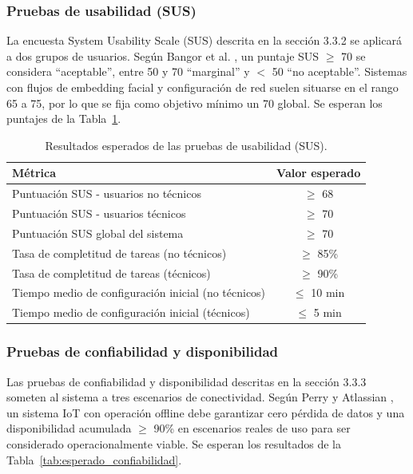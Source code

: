 \documentclass{iccmemoria}
\begin{document}
\subsubsection{Pruebas de usabilidad (SUS)}
La encuesta System Usability Scale (SUS) descrita en la sección 3.3.2 se aplicará a dos grupos de usuarios. Según Bangor et al. \cite{bangor2008}, un puntaje SUS $\geq$ 70 se considera ``aceptable'', entre 50 y 70 ``marginal'' y $<$ 50 ``no aceptable''. Sistemas con flujos de embedding facial y configuración de red suelen situarse en el rango 65 a 75, por lo que se fija como objetivo mínimo un 70 global. Se esperan los puntajes de la Tabla~\ref{tab:esperado_sus}.

\begin{table}[H]
\centering
\small
\begin{tabular}{|p{8cm}|c|}
\hline
\textbf{Métrica} & \textbf{Valor esperado} \\
\hline
Puntuación SUS - usuarios no técnicos & $\geq$ 68 \\
Puntuación SUS - usuarios técnicos & $\geq$ 70 \\
Puntuación SUS global del sistema & $\geq$ 70 \\
Tasa de completitud de tareas (no técnicos) & $\geq$ 85\% \\
Tasa de completitud de tareas (técnicos) & $\geq$ 90\% \\
Tiempo medio de configuración inicial (no técnicos) & $\leq$ 10 min \\
Tiempo medio de configuración inicial (técnicos) & $\leq$ 5 min \\
\hline
\end{tabular}
\caption{Resultados esperados de las pruebas de usabilidad (SUS).}
\label{tab:esperado_sus}
\end{table}

\subsubsection{Pruebas de confiabilidad y disponibilidad}
Las pruebas de confiabilidad y disponibilidad descritas en la sección 3.3.3 someten al sistema a tres escenarios de conectividad. Según Perry \cite{perry2006} y Atlassian \cite{atlassian_reliability}, un sistema IoT con operación offline debe garantizar cero pérdida de datos y una disponibilidad acumulada $\geq$ 90\% en escenarios reales de uso para ser considerado operacionalmente viable. Se esperan los resultados de la Tabla~\ref{tab:esperado_confiabilidad}.
\end{document}
